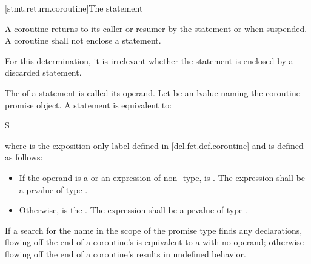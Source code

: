 [stmt.return.coroutine]{The  statement}%
%
%

\begin{bnf}
\br
      \terminal{;}
\end{bnf}

\pnum
A coroutine returns to its caller or resumer
by the  statement or when suspended.
A coroutine shall not enclose
a  statement.
\begin{note}
For this determination, it is irrelevant whether the  statement
is enclosed by a discarded statement.
\end{note}

\pnum
The  of a  statement is
called its operand.
Let  be an lvalue naming the coroutine
promise object.
A  statement is equivalent to:
\begin{ncsimplebnf}
\terminal{\{} S\terminal{;}  \terminal{;} \terminal{\}}
\end{ncsimplebnf}
where  is the exposition-only label
defined in \ref{dcl.fct.def.coroutine}
and  is defined as follows:
\begin{itemize}
\item
If the operand is a  or an expression of non- type,
 is \tcode{)}.
The expression  shall be a prvalue of type .

\item
Otherwise,
 is the  \tcode{\{}{ } \tcode{;} \tcode{;{ }\}}.
The expression 
shall be a prvalue of type .
\end{itemize}

\pnum
If a search for the name  in the scope of the promise type
finds any declarations,
flowing off the end of a coroutine's 
is equivalent to a  with no operand;
otherwise flowing off the end of a coroutine's 
results in undefined behavior.

